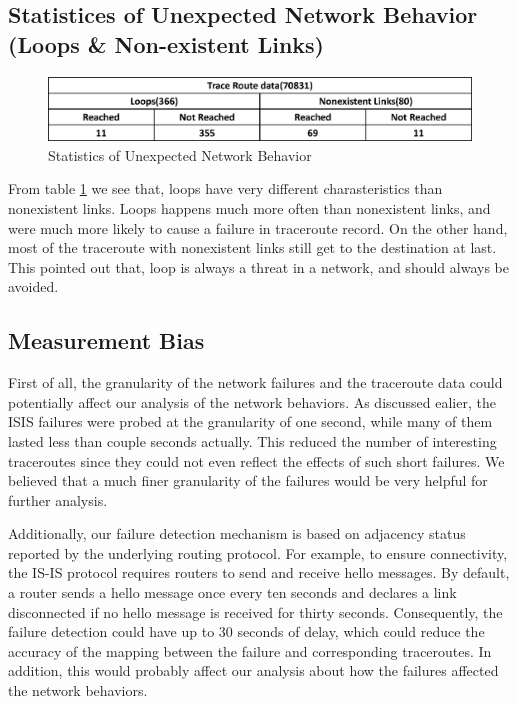 \documentclass[conference, twocolumn, oneside, 10pt]{IEEEtran}
\begin{document}
\subsection{Statistices of Unexpected Network Behavior (Loops \& Non-existent Links)}

\begin{figure}[h!]
\centering
\includegraphics[scale=0.6]{plot/Statistic.eps}
\caption{Statistics of Unexpected Network Behavior}
\label{fig:statistics}
\end{figure}
From table \ref{fig:statistics} we see that, loops have very different charasteristics than nonexistent links. Loops happens much more often than nonexistent links, and were much more likely to cause a failure in traceroute record. On the other hand, most of the traceroute with nonexistent links still get to the destination at last. This pointed out that, loop is always a threat in a network, and should always be avoided.

\subsection{Measurement Bias}

First of all, the granularity of the network failures and the traceroute data could potentially affect our analysis of the network behaviors. As discussed ealier, the ISIS failures were probed at the granularity of one second, while many of them lasted less than couple seconds actually. This reduced the number of interesting traceroutes since they could not even reflect the effects of such short failures. We believed that a much finer granularity of the failures would be very helpful for further analysis.

Additionally, our failure detection mechanism is based on adjacency status reported by the underlying routing protocol. For example, to ensure connectivity, the IS-IS protocol requires routers to send and receive hello messages. By default, a router sends a hello message once every ten seconds and declares a link disconnected if no hello message is received for thirty seconds. Consequently, the failure detection could have up to 30 seconds of delay, which could reduce the accuracy of the mapping between the failure and corresponding traceroutes. In addition, this would probably affect our analysis about how the failures affected the network behaviors.
\end{document}
